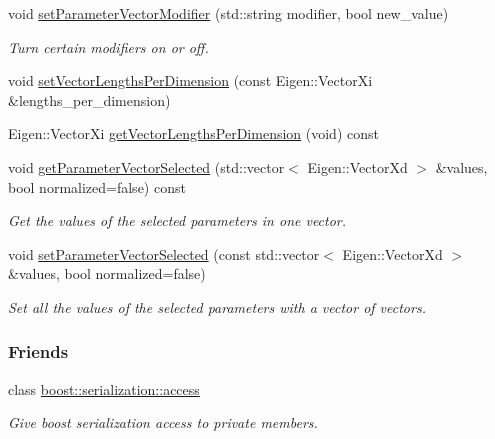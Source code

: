 \begin{DoxyCompactItemize}
void \hyperlink{classDmpBbo_1_1Parameterizable_a6eefba9dfdcfe8878c10150074c6a68e}{set\+Parameter\+Vector\+Modifier} (std\+::string modifier, bool new\+\_\+value)
\begin{DoxyCompactList}\small\item\em Turn certain modifiers on or off. \end{DoxyCompactList}\item 
void \hyperlink{classDmpBbo_1_1Parameterizable_a77089aa6cc3b95dd0a1c17de7bc033b9}{set\+Vector\+Lengths\+Per\+Dimension} (const Eigen\+::\+Vector\+Xi \&lengths\+\_\+per\+\_\+dimension)
\item 
Eigen\+::\+Vector\+Xi \hyperlink{classDmpBbo_1_1Parameterizable_a410ef532c4861b8d50c35508fa114484}{get\+Vector\+Lengths\+Per\+Dimension} (void) const 
\item 
void \hyperlink{classDmpBbo_1_1Parameterizable_a235305eba6732091193aa95869d78514}{get\+Parameter\+Vector\+Selected} (std\+::vector$<$ Eigen\+::\+Vector\+Xd $>$ \&values, bool normalized=false) const 
\begin{DoxyCompactList}\small\item\em Get the values of the selected parameters in one vector. \end{DoxyCompactList}\item 
void \hyperlink{classDmpBbo_1_1Parameterizable_a9b7c8caab0ded09410636d136e7da9f8}{set\+Parameter\+Vector\+Selected} (const std\+::vector$<$ Eigen\+::\+Vector\+Xd $>$ \&values, bool normalized=false)
\begin{DoxyCompactList}\small\item\em Set all the values of the selected parameters with a vector of vectors. \end{DoxyCompactList}\end{DoxyCompactItemize}
\subsubsection*{Friends}
\begin{DoxyCompactItemize}
\item 
class \hyperlink{classDmpBbo_1_1Parameterizable_ac98d07dd8f7b70e16ccb9a01abf56b9c}{boost\+::serialization\+::access}
\begin{DoxyCompactList}\small\item\em Give boost serialization access to private members. \end{DoxyCompactList}\end{DoxyCompactItemize}


